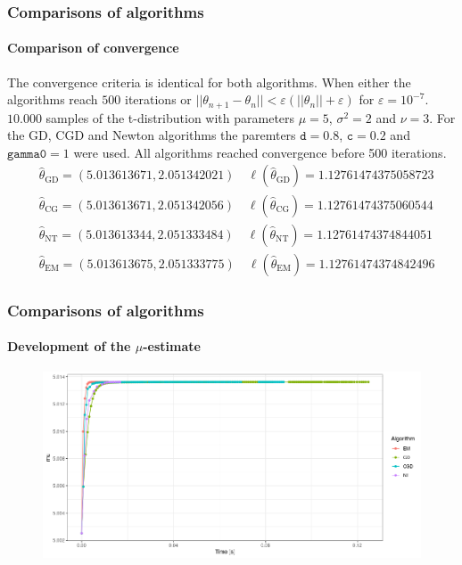 \documentclass[aspectratio=169]{beamer}
\begin{document}
\begin{frame}
    \frametitle{Comparisons of algorithms}
    \framesubtitle{Comparison of convergence}
    The convergence criteria is identical for both algorithms. When either the algorithms reach $500$ iterations or $||\theta_{n+1} -\theta_{n}||<\varepsilon(||\theta_{n}||+\varepsilon)$ for $\varepsilon = 10^{-7}$.\\[12pt]
    $10.000$ samples of the t-distribution with parameters $\mu = 5$, $\sigma^{2}=2$ and $\nu = 3$. For the GD, CGD and Newton algorithms the paremters $\texttt{d} = 0.8$, $\texttt{c} = 0.2$ and $\texttt{gamma0} = 1$ were used. All algorithms reached convergence before 500 iterations.
    \begin{align*}
        &\hat\theta_{\text{GD}}=(5.013613671, 2.051342021) \quad \ell(\hat\theta_{\text{GD}})=1.12761474375058723\\
        &\hat\theta_{\text{CG}}=(5.013613671, 2.051342056) \quad \ell(\hat\theta_{\text{CG}})=1.12761474375060544\\
        &\hat\theta_{\text{NT}}=(5.013613344, 2.051333484) \quad \ell(\hat\theta_{\text{NT}})=1.12761474374844051\\
        &\hat\theta_{\text{EM}}=(5.013613675, 2.051333775) \quad \ell(\hat\theta_{\text{EM}})=1.12761474374842496
    \end{align*}
\end{frame}
\begin{frame}
    \frametitle{Comparisons of algorithms}
    \framesubtitle{Development of the $\mu$-estimate}
    \begin{figure}
        \centering
        \includegraphics[scale = 0.4]{pictures/NewComp/AllMuNu3.png}
    \end{figure}
\end{frame}
\end{document}
